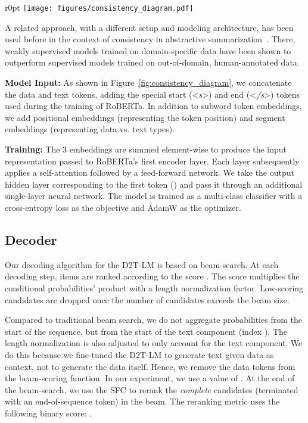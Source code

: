 \documentclass[11pt]{article}
\newcommand{\dtlm}{\textsc{D2T-LM}\xspace}
\newcommand{\sfc}{SFC\xspace}
\theoremstyle{definition}
\theoremstyle{break}
\newcommand{\specialtoken}[1]{\mbox{\textless \textit{#1}\textgreater}}
\begin{document}
\begin{wrapfigure}{r}{0pt}
    \centering
    \texttt{[image: figures/consistency\_diagram.pdf]}
    \caption{Semantic fidelity classifier setup}
    \label{fig:consistency_diagram}
\end{wrapfigure}


A related approach, with a different setup and modeling architecture, has been used before in the context of consistency in abstractive summarization~\cite{kryscinski2019evaluating}. There, weakly supervised models trained on domain-specific data have been shown to outperform supervised models trained on out-of-domain, human-annotated data.


\textbf{Model Input:} 
As shown in Figure~\ref{fig:consistency_diagram}, we concatenate the data and text tokens, adding the special start (\specialtoken{s}) and end (\specialtoken{/s}) tokens used during the training of RoBERTa. In addition to subword token embeddings, we add positional embeddings (representing the token position) and segment embeddings (representing data vs. text types). 

\textbf{Training:}
The 3 embeddings are summed element-wise to produce the input representation passed to RoBERTa's first encoder layer. Each layer subsequently applies a self-attention followed by a feed-forward network. 
We take the output hidden layer corresponding to the first token () and pass it through an additional single-layer neural network. The model is trained as a multi-class classifier with a cross-entropy loss as the objective and AdamW as the optimizer.




\subsection{Decoder} 
\label{sec:decoding}

Our decoding algorithm for the \dtlm is based on beam-search.
At each decoding step, items are ranked according to the score . The score multiplies the conditional probabilities' product with a length normalization factor. Low-scoring candidates are dropped once the number of candidates exceeds the beam size.


Compared to traditional beam search, we do not aggregate probabilities from the start of the sequence, but from the start of the text component (index ). The length normalization is also adjusted to only account for the text component. 
We do this because we fine-tuned the \dtlm to generate text given data as context, not to generate the data itself. 
Hence, we remove the data tokens from the beam-scoring function. In our experiment, we use a value of .
At the end of the beam-search, we use the \sfc to rerank the \textit{complete} candidates (terminated with an end-of-sequence token) in the beam. The reranking metric uses the following binary score: .
\end{document}
